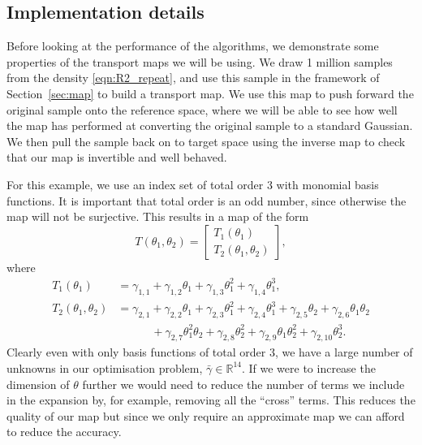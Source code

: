 \documentclass[final]{siamltex}
\begin{document}
\subsection{Implementation details}

Before looking at the performance of the algorithms, we demonstrate some properties of the transport maps we will be using. We draw 1 million samples from the density \eqref{eqn:R2_repeat}, and use this sample in the framework of Section~\ref{sec:map} to build a transport map. We use this map to push forward the original sample onto the reference space, where we will be able to see how well the map has performed at converting the original sample to a standard Gaussian. We then pull the sample back on to target space using the inverse map to check that our map is invertible and well behaved.

For this example, we use an index set of total order 3 with monomial
basis functions. It is important that total order is an odd number,
since otherwise the map will not be surjective. This results in a map of the form
\[
	T(\theta_1, \theta_2) = \begin{bmatrix} T_1(\theta_1) \\ T_2(\theta_1, \theta_2) \end{bmatrix},
\]
where
\begin{align*}
		T_1(\theta_1) &= \gamma_{1,1} + \gamma_{1,2}\theta_1 + \gamma_{1,3}\theta_1^2 + \gamma_{1,4}\theta_1^3, \\
		T_2(\theta_1, \theta_2) &= \gamma_{2,1} + \gamma_{2,2}\theta_1 + \gamma_{2,3}\theta_1^2 + \gamma_{2,4}\theta_1^3
					+ \gamma_{2,5}\theta_2 + \gamma_{2,6}\theta_1\theta_2 \\
				 & \qquad \quad + \gamma_{2,7}\theta_1^2\theta_2 + \gamma_{2,8}\theta_2^2 + \gamma_{2,9}\theta_1\theta_2^2 +
					 \gamma_{2,10}\theta_2^3.
\end{align*}
Clearly even with only basis functions of total order 3, we have a large number of unknowns in our optimisation problem, $\bar{\gamma} \in \mathbb{R}^{14}$. If we were to increase the dimension of $\theta$ further we would need to reduce the number of terms we include in the expansion by, for example, removing all the ``cross'' terms. This reduces the quality of our map but since we only require an approximate map we can afford to reduce the accuracy.
\end{document}
